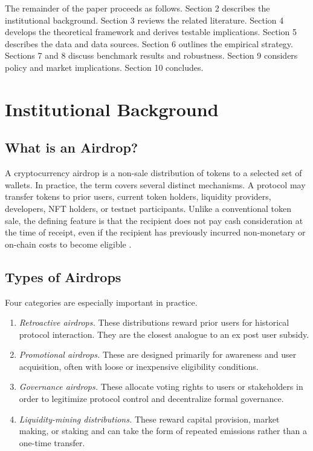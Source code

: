 \documentclass[11pt]{article}
\theoremstyle{remark}
\begin{document}
The remainder of the paper proceeds as follows. Section 2 describes the institutional background. Section 3 reviews the related literature. Section 4 develops the theoretical framework and derives testable implications. Section 5 describes the data and data sources. Section 6 outlines the empirical strategy. Sections 7 and 8 discuss benchmark results and robustness. Section 9 considers policy and market implications. Section 10 concludes.

\section{Institutional Background}

\subsection{What is an Airdrop?}

A cryptocurrency airdrop is a non-sale distribution of tokens to a selected set of wallets. In practice, the term covers several distinct mechanisms. A protocol may transfer tokens to prior users, current token holders, liquidity providers, developers, NFT holders, or testnet participants. Unlike a conventional token sale, the defining feature is that the recipient does not pay cash consideration at the time of receipt, even if the recipient has previously incurred non-monetary or on-chain costs to become eligible \citep{allen2023why}.

\subsection{Types of Airdrops}

Four categories are especially important in practice.

\begin{enumerate}[leftmargin=1.5em]
\item \textit{Retroactive airdrops.} These distributions reward prior users for historical protocol interaction. They are the closest analogue to an ex post user subsidy.
\item \textit{Promotional airdrops.} These are designed primarily for awareness and user acquisition, often with loose or inexpensive eligibility conditions.
\item \textit{Governance airdrops.} These allocate voting rights to users or stakeholders in order to legitimize protocol control and decentralize formal governance.
\item \textit{Liquidity-mining distributions.} These reward capital provision, market making, or staking and can take the form of repeated emissions rather than a one-time transfer.
\end{enumerate}
\end{document}
